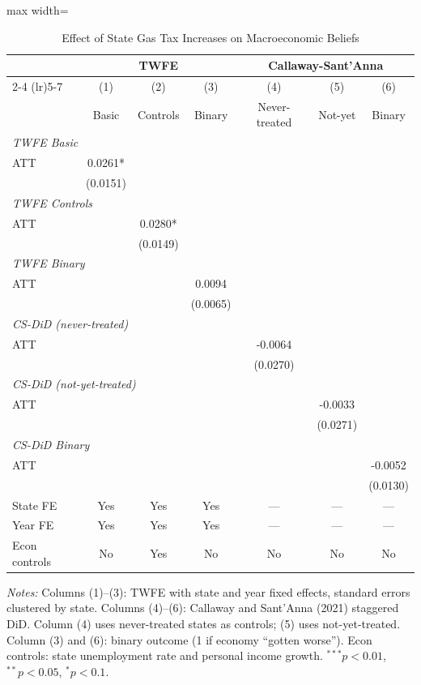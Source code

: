 \begin{table}[htbp]
\centering
\caption{Effect of State Gas Tax Increases on Macroeconomic Beliefs}
\label{tab:main}
\begin{adjustbox}{max width=\textwidth}
\begin{tabular}{lcccccc}
\toprule
& \multicolumn{3}{c}{TWFE} & \multicolumn{3}{c}{Callaway-Sant'Anna} \\
\cmidrule(lr){2-4} \cmidrule(lr){5-7}
& (1) & (2) & (3) & (4) & (5) & (6) \\
& Basic & Controls & Binary & Never-treated & Not-yet & Binary \\
\midrule
\multicolumn{7}{l}{\textit{ TWFE Basic }} \\
ATT & 0.0261* &  &  &  &  &  \\
& (0.0151) &  &  &  &  &  \\
\multicolumn{7}{l}{\textit{ TWFE Controls }} \\
ATT &  & 0.0280* &  &  &  &  \\
&  & (0.0149) &  &  &  &  \\
\multicolumn{7}{l}{\textit{ TWFE Binary }} \\
ATT &  &  & 0.0094 &  &  &  \\
&  &  & (0.0065) &  &  &  \\
\multicolumn{7}{l}{\textit{ CS-DiD (never-treated) }} \\
ATT &  &  &  & -0.0064 &  &  \\
&  &  &  & (0.0270) &  &  \\
\multicolumn{7}{l}{\textit{ CS-DiD (not-yet-treated) }} \\
ATT &  &  &  &  & -0.0033 &  \\
&  &  &  &  & (0.0271) &  \\
\multicolumn{7}{l}{\textit{ CS-DiD Binary }} \\
ATT &  &  &  &  &  & -0.0052 \\
&  &  &  &  &  & (0.0130) \\
\midrule
State FE & Yes & Yes & Yes & --- & --- & --- \\
Year FE & Yes & Yes & Yes & --- & --- & --- \\
Econ controls & No & Yes & No & No & No & No \\
\bottomrule
\end{tabular}
\end{adjustbox}
\begin{tablenotes}[flushleft]
\small
\item \textit{Notes:} Columns (1)--(3): TWFE with state and year fixed effects, standard errors clustered by state. Columns (4)--(6): Callaway and Sant'Anna (2021) staggered DiD. Column (4) uses never-treated states as controls; (5) uses not-yet-treated. Column (3) and (6): binary outcome (1 if economy ``gotten worse''). Econ controls: state unemployment rate and personal income growth. $^{***}p<0.01$, $^{**}p<0.05$, $^{*}p<0.1$.
\end{tablenotes}
\end{table}
